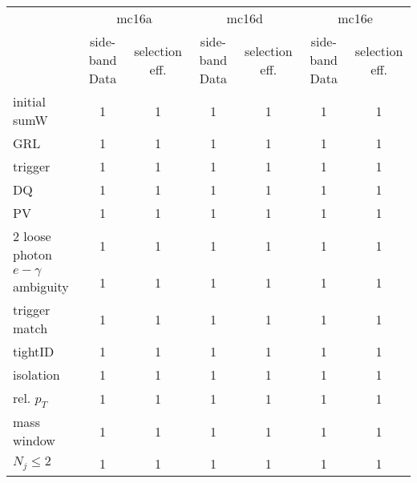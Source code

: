 \begin{table}[htbp]
\begin{center}
\begin{tabular}{l|cccccc}
\hline
                     & \multicolumn{2}{c}{mc16a}        & \multicolumn{2}{c}{mc16d}       & \multicolumn{2}{c}{mc16e}        \\
                     & side-band Data  & selection eff. &side-band Data  & selection eff. & side-band Data  & selection eff. \\ \hline
initial sumW         & 1               & 1              & 1              & 1              & 1               & 1              \\
GRL                  & 1               & 1              & 1              & 1              & 1               & 1              \\
trigger              & 1               & 1              & 1              & 1              & 1               & 1              \\
DQ                   & 1               & 1              & 1              & 1              & 1               & 1              \\
PV                   & 1               & 1              & 1              & 1              & 1               & 1              \\
2 loose photon       & 1               & 1              & 1              & 1              & 1               & 1              \\
$e-\gamma$ ambiguity & 1               & 1              & 1              & 1              & 1               & 1              \\
trigger match        & 1               & 1              & 1              & 1              & 1               & 1              \\
tightID              & 1               & 1              & 1              & 1              & 1               & 1              \\
isolation            & 1               & 1              & 1              & 1              & 1               & 1              \\
rel. $p_{T}$         & 1               & 1              & 1              & 1              & 1               & 1              \\
mass window          & 1               & 1              & 1              & 1              & 1               & 1              \\
$N_{j}\le2$          & 1               & 1              & 1              & 1              & 1               & 1              \\

\end{tabular}
\end{center}
\end{table}
